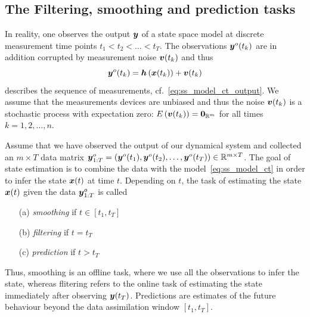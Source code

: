 \documentclass[10pt,a4paper, twocolumn]{article}
\renewcommand{\vec}[1]{{\mbox{\mathversion{bold}\ensuremath{#1}}}}
\begin{document}
\subsection{The Filtering, smoothing and prediction tasks}
In reality, one observes the output $\vec{y}$ of a state space model at discrete measurement time points $t_1 < t_2 < \ldots < t_T$. The observations $\vec{y}^o(t_k)$ are in addition corrupted by measurement noise $\vec{v}(t_k)$ and thus 
\begin{equation}
\vec{y}^o(t_k) = \vec{h}\left(\vec{x}(t_k)\right) + \vec{v}(t_k)
\end{equation}
describes the sequence of measurements, cf.~\eqref{eq:ss_model_ct_output}. We assume that the measurements devices are unbiased and thus the  noise $\vec{v}(t_k)$ is a stochastic process with expectation zero: $E\left(\vec{v}(t_k) \right) = \vec{0}_{\mathbb{R}^m}$ for all times $k=1,2,\ldots,n $. 


Assume that we have observed the output of our dynamical system and  collected an $m \times T$ data matrix $\vec{y}^o_{1:T}=\left(\vec{y}^o(t_1),\vec{y}^o(t_2),\ldots ,\vec{y}^o(t_T)\right) \in \mathbb{R}^{m \times T}$. The goal of state estimation is to combine the data with the model~\eqref{eq:ss_model_ct}  in order to infer the state $\vec{x}(t)$  at time $t$. Depending on $t$, the task of estimating the state $\vec{x}(t)$ given the data $\vec{y}^o_{1:T}$ is called 
\begin{itemize}
\item[(a)] {\em smoothing}  if $t \in [t_1,t_T]$
\item[(b)] {\em filtering} if $t = t_T$
\item[(c)] {\em prediction} if $t > t_T$
\end{itemize}
Thus, smoothing is an offline task, where we use all the observations to infer the state, whereas flitering refers to the online task of estimating the state immediately after observing $\vec{y}(t_T)$. Predictions are estimates of the future behaviour beyond the data assimilation window $[t_1,t_T]$.
\end{document}
